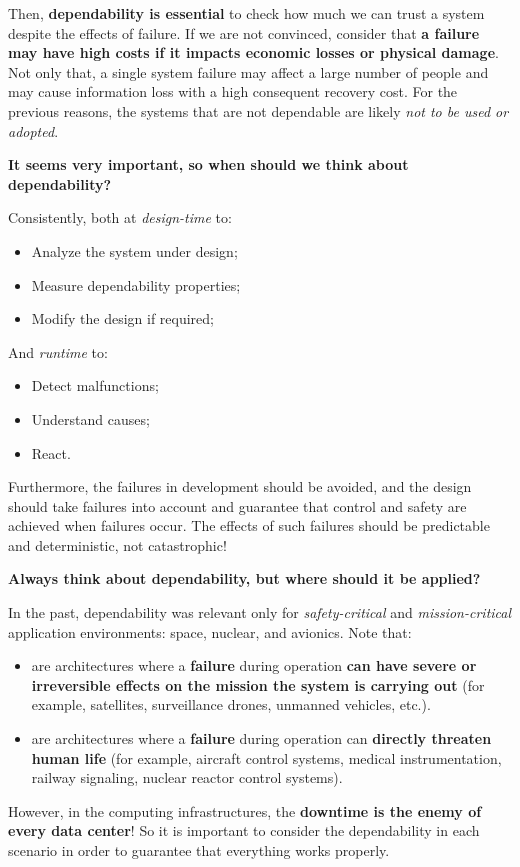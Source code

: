 \highspace
Then, \textbf{dependability is essential} to check how much we can trust a system despite the effects of failure. If we are not convinced, consider that \textbf{a failure may have high costs if it impacts economic losses or physical damage}. Not only that, a single system failure may affect a large number of people and may cause information loss with a high consequent recovery cost. For the previous reasons, the systems that are not dependable are likely \emph{not to be used or adopted}.

\highspace
\begin{flushleft}
    \textcolor{Green3}{ \textbf{It seems very important, so when should we think about dependability?}}
\end{flushleft}
Consistently, both at \emph{design-time} to:
\begin{itemize}
    \item Analyze the system under design;
    \item Measure dependability properties;
    \item Modify the design if required;
\end{itemize}
And \emph{runtime} to:
\begin{itemize}
    \item Detect malfunctions;
    \item Understand causes;
    \item React.
\end{itemize}
Furthermore, the failures in development should be avoided, and the design should take failures into account and guarantee that control and safety are achieved when failures occur. The effects of such failures should be predictable and deterministic, not catastrophic!

\highspace
\begin{flushleft}
    \textcolor{Green3}{ \textbf{Always think about dependability, but where should it be applied?}}
\end{flushleft}
In the past, dependability was relevant only for \emph{safety-critical} and \emph{mission-critical} application environments: space, nuclear, and avionics. Note that:
\begin{itemize}
    \item {} are architectures where a \textbf{failure} during operation \textbf{can have severe or irreversible effects on the mission the system is carrying out} (for example, satellites, surveillance drones, unmanned vehicles, etc.).
    
    \item {} are architectures where a \textbf{failure} during operation can \textbf{directly threaten human life} (for example, aircraft control systems, medical instrumentation, railway signaling, nuclear reactor control systems).
\end{itemize}
However, in the computing infrastructures, the \textbf{downtime is the enemy of every data center}! So it is important to consider the dependability in each scenario in order to guarantee that everything works properly.

